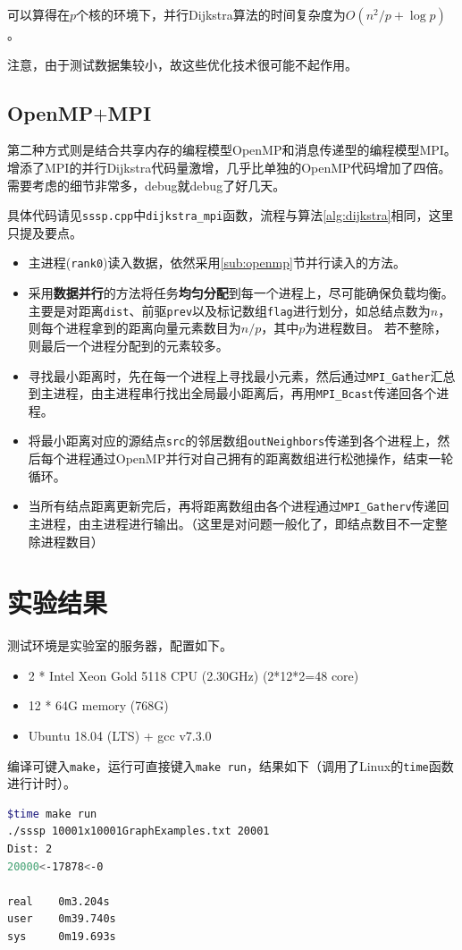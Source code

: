 \documentclass[reportComp]{thesis}
\begin{document}
可以算得在$p$个核的环境下，并行Dijkstra算法的时间复杂度为$O(n^2/p+\log p)$。

注意，由于测试数据集较小，故这些优化技术很可能不起作用。

\subsection{OpenMP$+$MPI}
第二种方式则是结合共享内存的编程模型OpenMP和消息传递型的编程模型MPI。
增添了MPI的并行Dijkstra代码量激增，几乎比单独的OpenMP代码增加了四倍。
需要考虑的细节非常多，debug就debug了好几天。

具体代码请见\verb'sssp.cpp'中\verb'dijkstra_mpi'函数，流程与算法\ref{alg:dijkstra}相同，这里只提及要点。
\begin{itemize}
	\item 主进程(\verb'rank0')读入数据，依然采用\ref{sub:openmp}节并行读入的方法。
	\item 采用\textbf{数据并行}的方法将任务\textbf{均匀分配}到每一个进程上，尽可能确保负载均衡。
	主要是对距离\verb'dist'、前驱\verb'prev'以及标记数组\verb'flag'进行划分，如总结点数为$n$，则每个进程拿到的距离向量元素数目为$n/p$，其中$p$为进程数目。
	若不整除，则最后一个进程分配到的元素较多。
	\item 寻找最小距离时，先在每一个进程上寻找最小元素，然后通过\verb'MPI_Gather'汇总到主进程，由主进程串行找出全局最小距离后，再用\verb'MPI_Bcast'传递回各个进程。
	\item 将最小距离对应的源结点\verb'src'的邻居数组\verb'outNeighbors'传递到各个进程上，然后每个进程通过OpenMP并行对自己拥有的距离数组进行松弛操作，结束一轮循环。
	\item 当所有结点距离更新完后，再将距离数组由各个进程通过\verb'MPI_Gatherv'传递回主进程，由主进程进行输出。（这里是对问题一般化了，即结点数目不一定整除进程数目）
\end{itemize}

\section{实验结果}
测试环境是实验室的服务器，配置如下。
\begin{itemize}
	\item 2 * Intel Xeon Gold 5118 CPU (2.30GHz) (2*12*2=48 core)
	\item 12 * 64G memory (768G)
	\item Ubuntu 18.04 (LTS) + gcc v7.3.0
\end{itemize}

编译可键入\verb'make'，运行可直接键入\verb'make run'，结果如下（调用了Linux的\verb'time'函数进行计时）。
\begin{lstlisting}[language=bash]
$time make run
./sssp 10001x10001GraphExamples.txt 20001
Dist: 2
20000<-17878<-0

real    0m3.204s
user    0m39.740s
sys     0m19.693s
\end{lstlisting}
\end{document}
